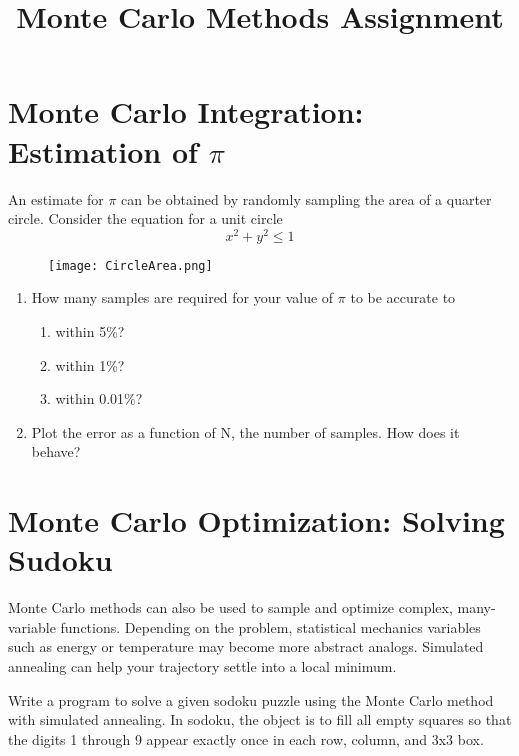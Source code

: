 \documentclass[11pt,]{article}   	%
\title{Monte Carlo Methods Assignment}
\date{}							%
\begin{document}
\maketitle

\part{Monte Carlo Integration: Estimation of $\pi$}
An estimate for $\pi$ can be obtained by randomly sampling the area of a quarter circle. 
Consider the equation for a unit circle
$$
x^2 + y^2 \leq 1
$$
 
\begin{figure}[H]
\begin{center}
\texttt{[image: CircleArea.png]}
\end{center}
\caption{}
\label{}
\end{figure}
 
\begin{enumerate}

\item How many samples are required for your value of $\pi$ to be accurate to
	
	\begin{enumerate} 
	\item within 5\%?
	\item within 1\%?
	\item within 0.01\%?
	\end{enumerate}
	
\item Plot the error as a function of N, the number of samples. How does it behave? 

\end{enumerate}


\part{Monte Carlo Optimization: Solving Sudoku}
Monte Carlo methods can also be used to sample and optimize complex, many-variable functions. 
Depending on the problem, statistical mechanics variables such as energy or temperature may become more abstract analogs. Simulated annealing can help your trajectory settle into a local minimum. 

Write a program to solve a given sodoku puzzle using the Monte Carlo method with simulated annealing. In sodoku, the object is to fill all empty squares so that the digits 1 through 9 appear exactly once in each row, column, and 3x3 box. 
\end{document}

